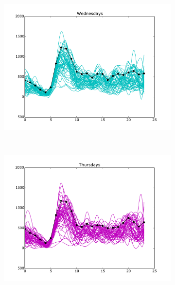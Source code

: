 \documentclass[10pt,a4paper]{amsart}
\begin{document}
\begin{figure}[h!]
    \begin{subfigure}[b]{0.5\textwidth}
        \includegraphics[width=\textwidth]
        		{Figures/Daily_trends_AC_Wednesday.pdf}
    \end{subfigure}
    ~
    \begin{subfigure}[b]{0.5\textwidth}
        \includegraphics[width=\textwidth]
        		{Figures/Daily_trends_AC_Thursday.pdf}
    \end{subfigure}
    

\end{figure}
\end{document}
